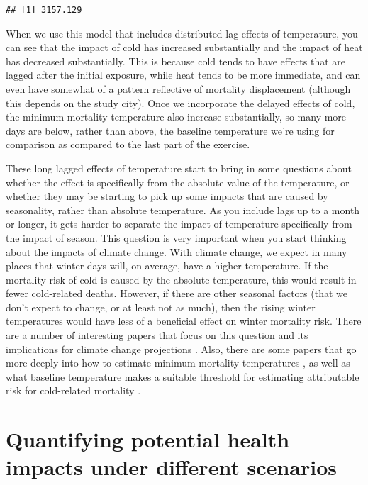 \documentclass[
]{book}
\begin{document}
\begin{verbatim}
## [1] 3157.129
\end{verbatim}

When we use this model that includes distributed lag effects of temperature, you can see that the impact of cold has increased substantially and the impact of heat has decreased substantially. This is because cold tends to have effects that are lagged after the initial exposure, while heat tends to be more immediate, and can even have somewhat of a pattern reflective of mortality displacement (although this depends on the study city). Once we incorporate the delayed effects of cold, the minimum mortality temperature also increase substantially, so many more days are below, rather than above, the baseline temperature we're using for comparison as compared to the last part of the exercise.

These long lagged effects of temperature start to bring in some questions about whether the effect is specifically from the absolute value of the temperature, or whether they may be starting to pick up some impacts that are caused by seasonality, rather than absolute temperature. As you include lags up to a month or longer, it gets harder to separate the impact of temperature specifically from the impact of season. This question is very important when you start thinking about the impacts of climate change. With climate change, we expect in many places that winter days will, on average, have a higher temperature. If the mortality risk of cold is caused by the absolute temperature, this would result in fewer cold-related deaths. However, if there are other seasonal factors (that we don't expect to change, or at least not as much), then the rising winter temperatures would have less of a beneficial effect on winter mortality risk. There are a number of interesting papers that focus on this question and its implications for climate change projections \citep{kinney2015winter, ebi2015greater, hajat2016excess}. Also, there are some papers that go more deeply into how to estimate minimum mortality temperatures \citep{lee2017monte, tobias2017investigating}, as well as what baseline temperature makes a suitable threshold for estimating attributable risk for cold-related mortality \citep{arbuthnott2018cold}.

\section{Quantifying potential health impacts under different scenarios}\label{quantifying-potential-health-impacts-under-different-scenarios}
\end{document}
